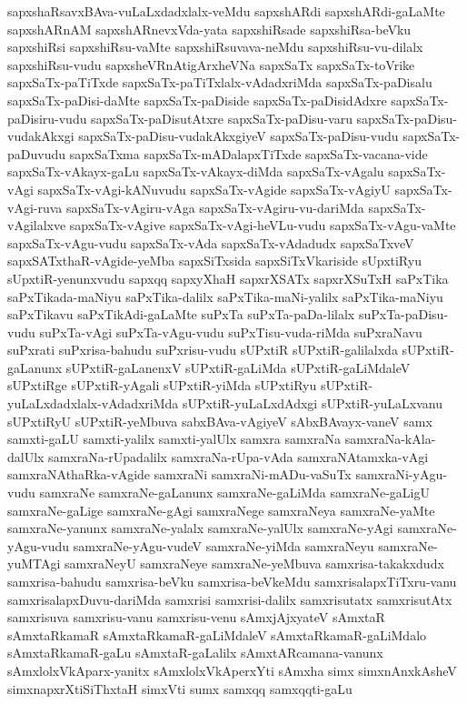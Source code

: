 {sapxshaRsavxBAva-vuLaLxdadxlalx-veMdu
sapxshARdi
sapxshARdi-gaLaMte
sapxshARnAM
sapxshARnevxVda-yata
sapxshiRsade
sapxshiRsa-beVku
sapxshiRsi
sapxshiRsu-vaMte
sapxshiRsuvava-neMdu
sapxshiRsu-vu-dilalx
sapxshiRsu-vudu
sapxsheVRnAtigArxheVNa
sapxSaTx
sapxSaTx-toVrike
sapxSaTx-paTiTxde
sapxSaTx-paTiTxlalx-vAdadxriMda
sapxSaTx-paDisalu
sapxSaTx-paDisi-daMte
sapxSaTx-paDiside
sapxSaTx-paDisidAdxre
sapxSaTx-paDisiru-vudu
sapxSaTx-paDisutAtxre
sapxSaTx-paDisu-varu
sapxSaTx-paDisu-vudakAkxgi
sapxSaTx-paDisu-vudakAkxgiyeV
sapxSaTx-paDisu-vudu
sapxSaTx-paDuvudu
sapxSaTxma
sapxSaTx-mADalapxTiTxde
sapxSaTx-vacana-vide
sapxSaTx-vAkayx-gaLu
sapxSaTx-vAkayx-diMda
sapxSaTx-vAgalu
sapxSaTx-vAgi
sapxSaTx-vAgi-kANuvudu
sapxSaTx-vAgide
sapxSaTx-vAgiyU
sapxSaTx-vAgi-ruva
sapxSaTx-vAgiru-vAga
sapxSaTx-vAgiru-vu-dariMda
sapxSaTx-vAgilalxve
sapxSaTx-vAgive
sapxSaTx-vAgi-heVLu-vudu
sapxSaTx-vAgu-vaMte
sapxSaTx-vAgu-vudu
sapxSaTx-vAda
sapxSaTx-vAdadudx
sapxSaTxveV
sapxSATxthaR-vAgide-yeMba
sapxSiTxsida
sapxSiTxVkariside
sUpxtiRyu
sUpxtiR-yenunxvudu
sapxqq
sapxyXhaH
sapxrXSATx
sapxrXSuTxH
saPxTika
saPxTikada-maNiyu
saPxTika-dalilx
saPxTika-maNi-yalilx
saPxTika-maNiyu
saPxTikavu
saPxTikAdi-gaLaMte
suPxTa
suPxTa-paDa-lilalx
suPxTa-paDisu-vudu
suPxTa-vAgi
suPxTa-vAgu-vudu
suPxTisu-vuda-riMda
suPxraNavu
suPxrati
suPxrisa-bahudu
suPxrisu-vudu
sUPxtiR
sUPxtiR-galilalxda
sUPxtiR-gaLanunx
sUPxtiR-gaLanenxV
sUPxtiR-gaLiMda
sUPxtiR-gaLiMdaleV
sUPxtiRge
sUPxtiR-yAgali
sUPxtiR-yiMda
sUPxtiRyu
sUPxtiR-yuLaLxdadxlalx-vAdadxriMda
sUPxtiR-yuLaLxdAdxgi
sUPxtiR-yuLaLxvanu
sUPxtiRyU
sUPxtiR-yeMbuva
sabxBAva-vAgiyeV
sAbxBAvayx-vaneV
samx
samxti-gaLU
samxti-yalilx
samxti-yalUlx
samxra
samxraNa
samxraNa-kAla-dalUlx
samxraNa-rUpadalilx
samxraNa-rUpa-vAda
samxraNAtamxka-vAgi
samxraNAthaRka-vAgide
samxraNi
samxraNi-mADu-vaSuTx
samxraNi-yAgu-vudu
samxraNe
samxraNe-gaLanunx
samxraNe-gaLiMda
samxraNe-gaLigU
samxraNe-gaLige
samxraNe-gAgi
samxraNege
samxraNeya
samxraNe-yaMte
samxraNe-yanunx
samxraNe-yalalx
samxraNe-yalUlx
samxraNe-yAgi
samxraNe-yAgu-vudu
samxraNe-yAgu-vudeV
samxraNe-yiMda
samxraNeyu
samxraNe-yuMTAgi
samxraNeyU
samxraNeye
samxraNe-yeMbuva
samxrisa-takakxdudx
samxrisa-bahudu
samxrisa-beVku
samxrisa-beVkeMdu
samxrisalapxTiTxru-vanu
samxrisalapxDuvu-dariMda
samxrisi
samxrisi-dalilx
samxrisutatx
samxrisutAtx
samxrisuva
samxrisu-vanu
samxrisu-venu
sAmxjAjxyateV
sAmxtaR
sAmxtaRkamaR
sAmxtaRkamaR-gaLiMdaleV
sAmxtaRkamaR-gaLiMdalo
sAmxtaRkamaR-gaLu
sAmxtaR-gaLalilx
sAmxtARcamana-vanunx
sAmxlolxVkAparx-yanitx
sAmxlolxVkAperxYti
sAmxha
simx
simxnAnxkAsheV
simxnapxrXtiSiThxtaH
simxVti
sumx
samxqq
samxqqti-gaLu
}
